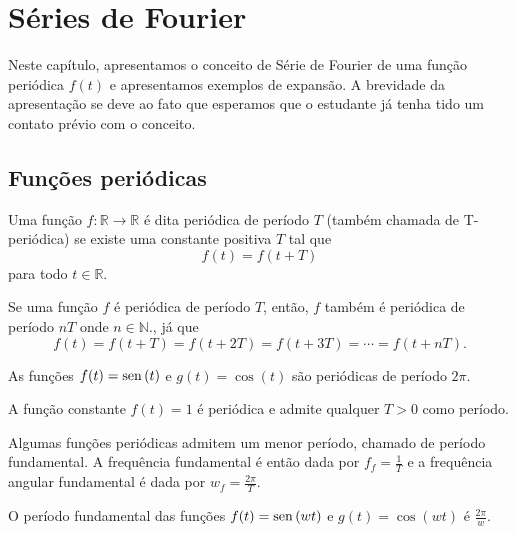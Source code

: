 \chapter{Séries de Fourier} %
Neste capítulo, apresentamos o conceito de Série de Fourier de uma função periódica $f(t)$ e apresentamos exemplos de expansão. A brevidade da apresentação se deve ao fato que esperamos que o estudante já tenha tido um contato prévio com o conceito.
\section{Funções periódicas}
\begin{defn} Uma função $f:\mathbb{R}\to\mathbb{R}$ é dita periódica de período $T$ (também chamada de T-periódica) se existe uma constante positiva $T$ tal que
\begin{equation}f(t)=f(t+T)\end{equation}
para todo $t\in\mathbb{R}.$
\end{defn}
\begin{obs} Se uma função $f$ é periódica de período $T$, então, $f$ também é periódica de período $nT$ onde $n\in\mathbb{N}.$, já que
\begin{equation}f(t)=f(t+T)=f(t+2T)=f(t+3T)=\cdots =f(t+nT).\end{equation}
 \end{obs}
 \begin{ex}
  As funções $f(t)=\operatorname{sen}\,(t)$ e $g(t)=\cos(t)$ são periódicas de período $2\pi$.
 \end{ex}
\begin{ex}
  A função constante $f(t)=1$ é periódica e admite qualquer $T>0$ como período.
 \end{ex}
\begin{defn} Algumas funções periódicas admitem um menor período, chamado de período fundamental. A frequência fundamental é então dada por $f_f=\frac{1}{T}$ e a frequência angular fundamental é dada por $w_f=\frac{2\pi}{T}$.
 \end{defn}
\begin{prop}O período fundamental das funções $f(t)=\operatorname{sen}\,(wt)$ e $g(t)=\cos(wt)$ é $\frac{2\pi}{w} $. 
\end{prop}

